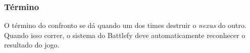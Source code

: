 \subsubsection{Término}

O término do confronto se dá quando um dos times destruir o \textit{nexus} do outro. Quando isso correr, o sistema do Battlefy deve automaticamente reconhecer o resultado do jogo.
